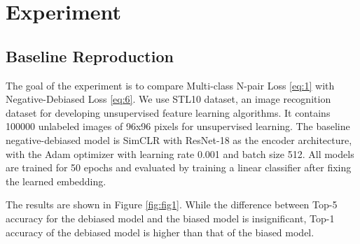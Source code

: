 \documentclass{article}
\begin{document}

\section{Experiment}
\subsection{Baseline Reproduction}

The goal of the experiment is to compare Multi-class N-pair Loss \ref{eq:1} with Negative-Debiased Loss \ref{eq:6}. We use STL10 \citep{pmlr-v15-coates11a} dataset, an image recognition dataset for developing unsupervised feature learning algorithms. It contains 100000 unlabeled images of 96x96 pixels for unsupervised learning. The baseline negative-debiased model is SimCLR \citep{Chen2020SimCLR} with ResNet-18 \citep{7780459} as the encoder architecture, with the Adam optimizer \citep{Diederik2014Adam} with learning rate 0.001 and batch size 512. All models are trained for 50 epochs and evaluated by training a linear classifier after fixing the learned embedding.

 The results are shown in Figure \ref{fig:fig1}. While the difference between Top-5 accuracy for the debiased model and the biased model is insignificant, Top-1 accuracy of the debiased model is higher than that of the biased model. 
\end{document}
